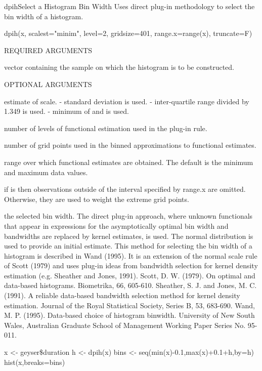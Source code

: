 \begin{Helpfile}{dpih}{Select a Histogram Bin Width }
Uses direct plug-in methodology to select the bin width of 
a histogram.
\begin{Example}
dpih(x, scalest="minim", level=2, gridsize=401, 
     range.x=range(x), truncate=F)
\end{Example}
\begin{Argument}{REQUIRED ARGUMENTS}
\item[\Co{x:}]
vector containing the sample on which the
histogram is to be constructed.
\end{Argument}
\begin{Argument}{OPTIONAL ARGUMENTS}
\item[\Co{scalest:}]
estimate of scale.
  - standard deviation is used.
  - inter-quartile range divided by 1.349 is used.
  - minimum of  and  is used.
\item[\Co{level:}]
number of levels of functional estimation used in the
plug-in rule.
\item[\Co{gridsize:}]
number of grid points used in the binned approximations
to functional estimates.
\item[\Co{range.x:}]
range over which functional estimates are obtained.
The default is the minimum and maximum data values.
\item[\Co{truncate:}]
if  is  then observations outside
of the interval specified by range.x are omitted.
Otherwise, they are used to weight the extreme grid points.
\end{Argument}
the selected bin width.
The direct plug-in approach, where unknown functionals
that appear in expressions for the asymptotically
optimal bin width and bandwidths
are replaced by kernel estimates, is used.
The normal distribution is used to provide an
initial estimate.
This method for selecting the bin width of a histogram is
described in Wand (1995). It is an extension of the
normal scale rule of Scott (1979) and uses plug-in ideas
from bandwidth selection for kernel density estimation
(e.g. Sheather and Jones, 1991).
Scott, D. W. (1979). 
On optimal and data-based histograms.
Biometrika, 66, 605-610.
Sheather, S. J. and Jones, M. C. (1991).
A reliable data-based bandwidth selection method for
kernel density estimation.
Journal of the Royal Statistical Society, Series B, 53, 683-690. 
Wand, M. P. (1995).
Data-based choice of histogram binwidth.
University of New South Wales,
Australian Graduate School of Management 
Working Paper Series No. 95-011.
\need 15pt
\vspace{-16pt}
\begin{Example}
x <- geyser\$duration
h <- dpih(x)
bins <- seq(min(x)-0.1,max(x)+0.1+h,by=h)
hist(x,breaks=bins)
\end{Example}
\end{Helpfile}
